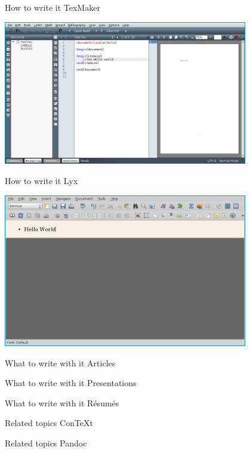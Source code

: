 \documentclass{beamer}
\begin{document}
\begin{frame}{How to write it \textendash{} TexMaker}
    \begin{center}
        \includegraphics[width=0.8\textwidth]{img/texmaker}
    \end{center}
\end{frame}

\begin{frame}{How to write it \textendash{} Lyx}
    \begin{center}
        \includegraphics[width=0.8\textwidth]{img/lyx}
    \end{center}
\end{frame}

\begin{frame}{What to write with it \textendash{} Articles}
\end{frame}

\begin{frame}{What to write with it \textendash{} Presentations}
\end{frame}

\begin{frame}{What to write with it \textendash{} R\'{e}sum\'{e}s}
\end{frame}

\begin{frame}{Related topics \textendash{} ConTeXt}
\end{frame}

\begin{frame}{Related topics \textendash{} Pandoc}
\end{frame}
\end{document}
